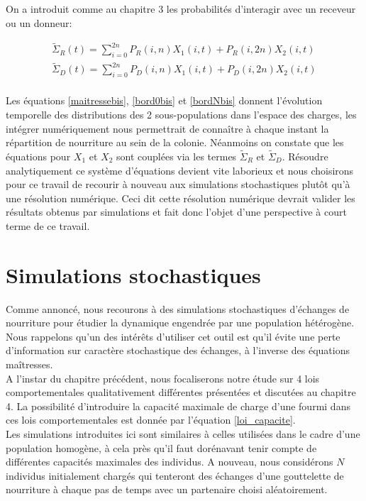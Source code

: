 On a introduit comme au chapitre 3 les probabilités d'interagir avec un receveur ou un donneur:

\begin{equation}
\begin{aligned}
\tilde{\Sigma}_R(t) = \sum_{i=0}^{2n} P_R(i,n) X_1(i,t)+ P_R(i,2n) X_2(i,t)\\
\tilde{\Sigma}_D(t) = \sum_{i=0}^{2n} P_D(i,n) X_1(i,t)+ P_D(i,2n) X_2(i,t)\\			
\end{aligned}
\end{equation}

Les équations \ref{maitressebis}, \ref{bord0bis} et \ref{bordNbis} donnent l'évolution temporelle des distributions des 2 sous-populations dans l'espace des charges, les intégrer numériquement nous permettrait de connaître à chaque instant la répartition de nourriture au sein de la colonie. Néanmoins on constate que les équations pour $X_1$ et $X_2$ sont couplées via les termes $\tilde{\Sigma}_R$ et $\tilde{\Sigma}_D$. Résoudre analytiquement ce système d'équations devient vite laborieux et nous choisirons pour ce travail de recourir à nouveau aux simulations stochastiques plutôt qu'à une résolution numérique. Ceci dit cette résolution numérique devrait valider les résultats obtenus par simulations et fait donc l'objet d'une perspective à court terme de ce travail.

\section{Simulations stochastiques}

Comme annoncé, nous recourons à des simulations stochastiques d'échanges de nourriture pour étudier la dynamique engendrée par une population hétérogène. Nous rappelons qu'un des intérêts d'utiliser cet outil est qu'il évite une perte d'information sur caractère stochastique des échanges, à l'inverse des équations maîtresses. \\

A l'instar du chapitre précédent, nous focaliserons notre étude sur 4 lois comportementales qualitativement différentes présentées et discutées au chapitre 4. La possibilité d'introduire la capacité maximale de charge d'une fourmi dans ces lois comportementales est donnée par l'équation \ref{loi_capacite}. \\ 

Les simulations introduites ici sont similaires à celles utilisées dans le cadre d'une population homogène, à cela près qu'il faut dorénavant tenir compte de différentes capacités maximales des individus. A nouveau, nous considérons $N$ individus initialement chargés qui tenteront des échanges d'une gouttelette de nourriture à chaque pas de temps avec un partenaire choisi aléatoirement.\\


